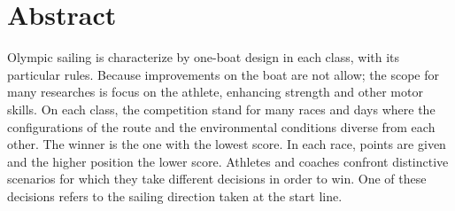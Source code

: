 



\section*{Abstract}
Olympic sailing is characterize by one-boat design in each class, with its particular rules. %
Because improvements on the boat are not allow; the scope for many researches is focus on the athlete, enhancing strength and other motor skills. On each class, the competition stand for many races and days where the configurations of the route and the environmental conditions diverse from each other. The winner is the one with the lowest score. In each race, points are given  and %
the higher position the lower score. Athletes and coaches confront distinctive scenarios for which they take different decisions in order to win. One of these decisions refers to the sailing direction taken at the start line.

